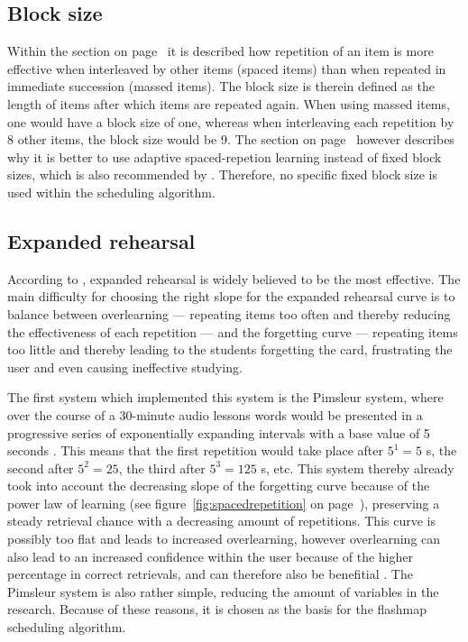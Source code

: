         \subsection{Block size}

Within the  section on page~\pageref{subsec:spacingeffect} it is described how repetition of an item is more effective when interleaved by other items (spaced items) than when repeated in immediate succession (massed items). The block size is therein defined as the length of items after which items are repeated again. When using massed items, one would have a block size of one, whereas when interleaving each repetition by 8 other items, the block size would be 9. The  section on page~\pageref{subsec:spacingeffect} however describes why it is better to use adaptive spaced-repetion learning instead of fixed block sizes, which is also recommended by . Therefore, no specific fixed block size is used within the scheduling algorithm.
        
        \subsection{Expanded rehearsal}

According to , expanded rehearsal is widely believed to be the most effective. The main difficulty for choosing the right slope for the expanded rehearsal curve is to balance between overlearning --- repeating items too often and thereby reducing the effectiveness of each repetition --- and the forgetting curve --- repeating items too little and thereby leading to the students forgetting the card, frustrating the user and even causing ineffective studying.

The first system which implemented this system is the Pimsleur system, where over the course of a 30-minute audio lessons words would be presented in a progressive series of exponentially expanding intervals with a base value of 5 seconds \cite{microlearning}. This means that the first repetition would take place after $5^1=5$ s, the second after $5^2=25$, the third after $5^3=125$ s, etc. This system thereby already took into account the decreasing slope of the forgetting curve because of the power law of learning (see figure~\ref{fig:spacedrepetition} on page~\pageref{fig:spacedrepetition}), preserving a steady retrieval chance with a decreasing amount of repetitions. This curve is possibly too flat and leads to increased overlearning, however overlearning can also lead to an increased confidence within the user because of the higher percentage in correct retrievals, and can therefore also be benefitial \cite{microlearning}. The Pimsleur system is also rather simple, reducing the amount of variables in the research. Because of these reasons, it is chosen as the basis for the flashmap scheduling algorithm.

